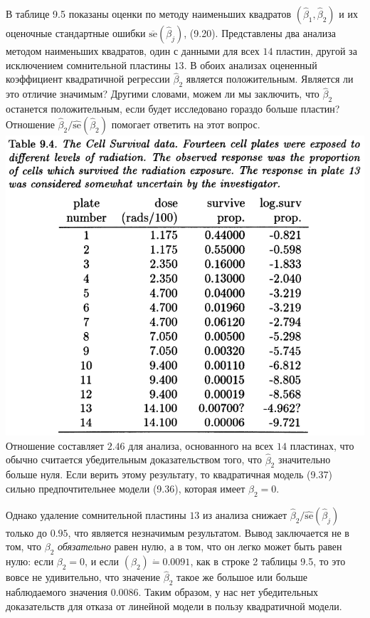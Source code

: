 В таблице 9.5 показаны оценки по методу наименьших квадратов $(\hat{\beta}_1, \hat{\beta}_2)$ и их оценочные стандартные ошибки $\overline{\text{se}}(\hat{\beta}_j)$, (9.20). Представлены два анализа методом наименьших квадратов, один с данными для всех $14$ пластин, другой за исключением сомнительной пластины $13$. В обоих анализах оцененный коэффициент квадратичной регрессии $\hat{\beta}_2$ является положительным. Является ли это отличие значимым? Другими словами, можем ли мы заключить, что $\hat{\beta}_2$ останется положительным, если будет исследовано гораздо больше пластин? Отношение $\hat{\beta}_2/\widehat{\text{se}}(\hat{\beta}_2)$ помогает ответить на этот вопрос. 
\noindent
\includegraphics[width=\linewidth]{9/t94}
\newline
Отношение составляет $2.46$ для анализа, основанного на всех $14$ пластинах, что обычно считается убедительным доказательством того, что $\hat{\beta}_2$ значительно больше нуля. Если верить этому результату, то квадратичная модель (9.37) сильно предпочтительнее модели (9.36), которая имеет $\beta_2 = 0$.

Однако удаление сомнительной пластины $13$ из анализа снижает $\hat{\beta}_2/\widehat{\text{se}}(\hat{\beta}_j)$ только до $0.95$, что является незначимым результатом. Вывод заключается не в том, что $\beta_2$ \textit{обязательно} равен нулю, а в том, что он легко может быть равен нулю: если $\beta_2 = 0$, и если $(\beta_2) \dot = 0.0091$, как в строке 2 таблицы 9.5, то это вовсе не удивительно, что значение $\hat{\beta}_2$ такое же большое или больше наблюдаемого значения $0.0086$. Таким образом, у нас нет убедительных доказательств для отказа от линейной модели в пользу квадратичной модели.

